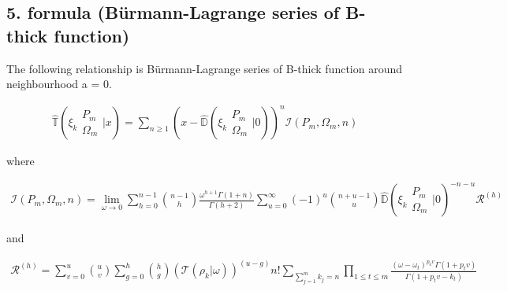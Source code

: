 \subsection{5. formula (Bürmann-Lagrange series of B-thick function)}

\begin{conjecture}
\label{mm}
      The following relationship is Bürmann-Lagrange series 
      of B-thick function around neighbourhood a = 0.
      
      \begin{align}
            \hat{\mathbb{T}}\left( \xi_k \begin{matrix} P_m \\
            \Omega_m \end{matrix} \bigg| x \right) 
            = \sum_{n \geq 1} \left( x - \hat{\mathbb{D}}\left(
            \xi_k \begin{matrix} P_m \\ \Omega_m \end{matrix} 
            \bigg| 0 \right)\right)^n \mathcal{I}(P_m, \Omega_m, n)
      \end{align}
      
      where 
      
      \begin{align}
            \mathcal{I}(P_m, \Omega_m, n) =  \lim_{\omega \to 0}
            \sum^{n-1}_{h=0} \binom{n-1}{h} \frac{\omega^{h+1}
            \Gamma(1+n)}{\Gamma(h+2)}  \sum_{u=0}^\infty (-1)^u 
            \binom{n + u - 1}{u}  \hat{\mathbb{D}}\left( \xi_k 
            \begin{matrix} P_m \\ \Omega_m \end{matrix} \bigg| 
            0 \right)^{-n-u}  \mathcal{R}^{(h)}
      \end{align}
      
      and
      
      \begin{align}
            \mathcal{R}^{(h)}= \sum_{v=0}^u \binom{u}{v} 
            \sum_{g=0}^h \binom{h}{g}  \left(\mathcal{T}(
            \rho_k | \omega) \right)^{(u-g)} n! \sum_{
            \sum_{j=1}^m k_j = n}\prod_{1 \leq t \leq m} 
            \frac{(\omega - \omega_t)^{p_k v}\Gamma(1+p_t 
            v)}{\Gamma(1+p_t v - k_t)} 
      \end{align}
\end{conjecture}
